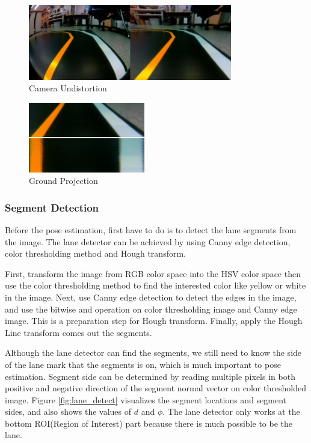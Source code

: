 \documentclass[conference]{IEEEtran}
\begin{document}
\begin{figure}
	\centering
	\includegraphics[width=3.5in]{img/intrinsic.png}
	\caption{Camera Undistortion}
	\label{fig:intrinsic}
\end{figure}

\begin{figure}	
	\centering
	\includegraphics[width=2in]{img/extrinsic.png}
	\caption{Ground Projection}
	\label{fig:extrinsic}
\end{figure}

\subsubsection{Segment Detection}

Before the pose estimation, first have to do is to detect the lane segments from the image. The lane detector can be achieved by using Canny edge detection, color thresholding method and Hough transform.

First, transform the image from RGB color space into the HSV color space then use the color thresholding method to find the interested color like yellow or white in the image. Next, use Canny edge detection to detect the edges in the image, and use the bitwise and operation on color thresholding image and Canny edge image. This is a preparation step for Hough transform. Finally, apply the Hough Line transform comes out the segments.
 
Although the lane detector can find the segments, we still need to know the side of the lane mark that the segments is on, which is much important to pose estimation. Segment side can be determined by reading multiple pixels in both positive and negative direction of the segment normal vector on color thresholded image. Figure \ref{fig:lane_detect} visualizes the segment locations and segment sides, and also shows the values of $d$ and $\phi$. The lane detector only works at the bottom ROI(Region of Interest) part because there is much possible to be the lane.
\end{document}
